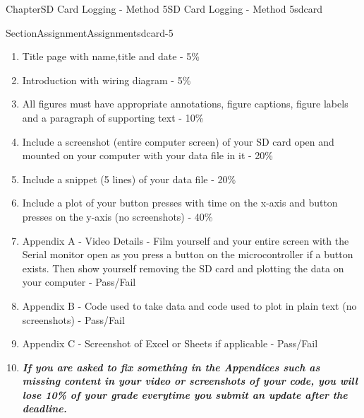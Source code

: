 \documentclass[oneside,10pt,]{book}
\newcommand{\alert}[1]{\textbf{\textit{#1}}}
\numberwithin{equation}{section}
\begin{document}
\begin{chapterptx}{Chapter}{SD Card Logging - Method 5}{}{SD Card Logging - Method 5}{}{}{sdcard}
\begin{sectionptx}{Section}{Assignment}{}{Assignment}{}{}{sdcard-5}
%
\begin{enumerate}
\item{}Title page with name,title and date - 5\%%
\item{}Introduction with wiring diagram - 5\%%
\item{}All figures must have appropriate annotations, figure captions, figure labels and a paragraph of supporting text - 10\%%
\item{}Include a screenshot (entire computer screen) of your SD card open and mounted on your computer with your data file in it - 20\%%
\item{}Include a snippet (5 lines) of your data file - 20\%%
\item{}Include a plot of your button presses with time on the x-axis and button presses on the y-axis (no screenshots) - 40\%%
\item{}Appendix A - Video Details - Film yourself and your entire screen with the Serial monitor open as you press a button on the microcontroller if a button exists. Then show yourself removing the SD card and plotting the data on your computer - Pass\slash{}Fail%
\item{}Appendix B - Code used to take data and code used to plot in plain text (no screenshots) - Pass\slash{}Fail%
\item{}Appendix C - Screenshot of Excel or Sheets if applicable - Pass\slash{}Fail%
\item{}\alert{If you are asked to fix something in the Appendices such as missing content in your video or screenshots of your code, you will lose 10\% of your grade everytime you submit an update after the deadline.}%
\end{enumerate}
\end{sectionptx}
\end{chapterptx}
%
%
\typeout{************************************************}
\typeout{************************************************}
%
\end{document}
